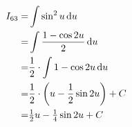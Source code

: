\def\no{63}
\def\theintegral{\(\int\sin^2{u}\;\dif{u}
\enspace=\enspace%
\tfrac{1}{2}\,{u}\;-\;\tfrac{1}{4}\,\sin{2{u}}\;+\;C\)}

\begin{align*}
{I}_{\no}
=&  \int  \sin^2{u} \dif u \\
=&  \int  \frac{1-\cos{2u}}{2} \dif u \\
=&  \frac{1}{2}\cdot\int  1-\cos{2u}  \dif u \\
=&  \frac{1}{2}\cdot \left(
      {u}-\frac{1}{2}\sin{2u}
    \right) + C \\
=&  \tfrac{1}{2} {u}
   -\tfrac{1}{4} \sin{2u} + C
\\
\end{align*}
